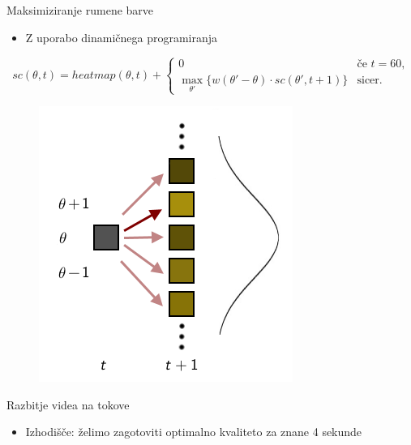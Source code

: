 \begin{frame}{Maksimiziranje rumene barve}
  \begin{itemize}
    \item Z uporabo dinamičnega programiranja
  \end{itemize}

\begin{displaymath}
  sc(\theta, t) = heatmap(\theta, t) + \left\{ \begin{array}{ll}
                                            0 & \textrm{če $t = 60$,}\\
                                            \displaystyle \max_{\theta'}\{w(\theta'-\theta) \cdot sc(\theta', t+1)\} & \textrm{sicer.}
  \end{array} \right.
\end{displaymath}
  \begin{figure}
    \includegraphics[scale=0.57]{img/dp3.png}
  \end{figure}
\end{frame}

\begin{frame}{Razbitje videa na tokove}
  \begin{itemize}
    \item Izhodišče: želimo zagotoviti optimalno kvaliteto za znane 4 sekunde
  \end{itemize}
\end{frame}

